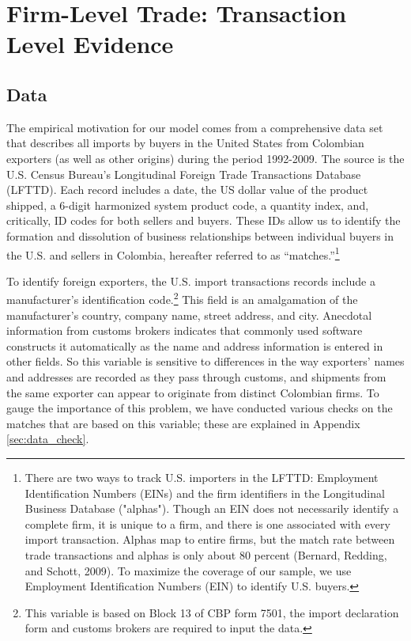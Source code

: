 \documentclass[12pt]{article}
\begin{document}
\section{Firm-Level Trade: Transaction Level Evidence}

\label{sec:data}

\subsection{Data}

The empirical motivation for our model comes from a comprehensive data set
that describes all imports by buyers in the United States from Colombian
exporters (as well as other origins) during the period 1992-2009. The source
is the U.S. Census Bureau's Longitudinal Foreign Trade Transactions Database
(LFTTD). Each record includes a date, the US dollar value of the product
shipped, a 6-digit harmonized system product code, a quantity index, and,
critically, ID codes for both sellers and buyers. These IDs allow us to
identify the formation and dissolution of business relationships between
individual buyers in the U.S. and sellers in Colombia, hereafter referred to
as \textquotedblleft matches.\textquotedblright \footnote{%
There are two ways to track U.S. importers in the LFTTD: Employment
Identification Numbers (EINs) and the firm identifiers in the Longitudinal
Business Database ("alphas"). Though an EIN does not necessarily identify a
complete firm, it is unique to a firm, and there is one associated with
every import transaction. Alphas map to entire firms, but the match rate
between trade transactions and alphas is only about 80 percent (Bernard,
Redding, and Schott, 2009). To maximize the coverage of our sample, we use
Employment Identification Numbers (EIN) to identify U.S. buyers.\medskip}\ 

To identify foreign exporters, the U.S. import transactions records include
a manufacturer's identification code.\footnote{%
This variable is based on Block 13 of CBP form 7501, the import declaration
form and customs brokers are required to input the data.} This field is an
amalgamation of the manufacturer's country, company name, street address,
and city. Anecdotal information from customs brokers indicates that commonly
used software constructs it automatically as the name and address
information is entered in other fields. So this variable is sensitive to
differences in the way exporters' names and addresses are recorded as they
pass through customs, and shipments from the same exporter can appear to
originate from distinct Colombian firms. To gauge the importance of this
problem, we have conducted various checks on the matches that are based on
this variable; these are explained in Appendix \ref{sec:data_check}.
\end{document}
